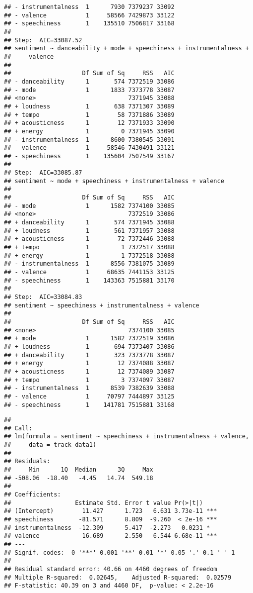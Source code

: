 \documentclass[]{article}
\begin{document}
\begin{verbatim}
## - instrumentalness  1      7930 7379237 33092
## - valence           1     58566 7429873 33122
## - speechiness       1    135510 7506817 33168
## 
## Step:  AIC=33087.52
## sentiment ~ danceability + mode + speechiness + instrumentalness + 
##     valence
## 
##                    Df Sum of Sq     RSS   AIC
## - danceability      1       574 7372519 33086
## - mode              1      1833 7373778 33087
## <none>                          7371945 33088
## + loudness          1       638 7371307 33089
## + tempo             1        58 7371886 33089
## + acousticness      1        12 7371933 33090
## + energy            1         0 7371945 33090
## - instrumentalness  1      8600 7380545 33091
## - valence           1     58546 7430491 33121
## - speechiness       1    135604 7507549 33167
## 
## Step:  AIC=33085.87
## sentiment ~ mode + speechiness + instrumentalness + valence
## 
##                    Df Sum of Sq     RSS   AIC
## - mode              1      1582 7374100 33085
## <none>                          7372519 33086
## + danceability      1       574 7371945 33088
## + loudness          1       561 7371957 33088
## + acousticness      1        72 7372446 33088
## + tempo             1         1 7372517 33088
## + energy            1         1 7372518 33088
## - instrumentalness  1      8556 7381075 33089
## - valence           1     68635 7441153 33125
## - speechiness       1    143363 7515881 33170
## 
## Step:  AIC=33084.83
## sentiment ~ speechiness + instrumentalness + valence
## 
##                    Df Sum of Sq     RSS   AIC
## <none>                          7374100 33085
## + mode              1      1582 7372519 33086
## + loudness          1       694 7373407 33086
## + danceability      1       323 7373778 33087
## + energy            1        12 7374088 33087
## + acousticness      1        12 7374089 33087
## + tempo             1         3 7374097 33087
## - instrumentalness  1      8539 7382639 33088
## - valence           1     70797 7444897 33125
## - speechiness       1    141781 7515881 33168
\end{verbatim}

\begin{verbatim}
## 
## Call:
## lm(formula = sentiment ~ speechiness + instrumentalness + valence, 
##     data = track_data1)
## 
## Residuals:
##     Min      1Q  Median      3Q     Max 
## -508.06  -18.40   -4.45   14.74  549.18 
## 
## Coefficients:
##                  Estimate Std. Error t value Pr(>|t|)    
## (Intercept)        11.427      1.723   6.631 3.73e-11 ***
## speechiness       -81.571      8.809  -9.260  < 2e-16 ***
## instrumentalness  -12.309      5.417  -2.273   0.0231 *  
## valence            16.689      2.550   6.544 6.68e-11 ***
## ---
## Signif. codes:  0 '***' 0.001 '**' 0.01 '*' 0.05 '.' 0.1 ' ' 1
## 
## Residual standard error: 40.66 on 4460 degrees of freedom
## Multiple R-squared:  0.02645,    Adjusted R-squared:  0.02579 
## F-statistic: 40.39 on 3 and 4460 DF,  p-value: < 2.2e-16
\end{verbatim}
\end{document}
